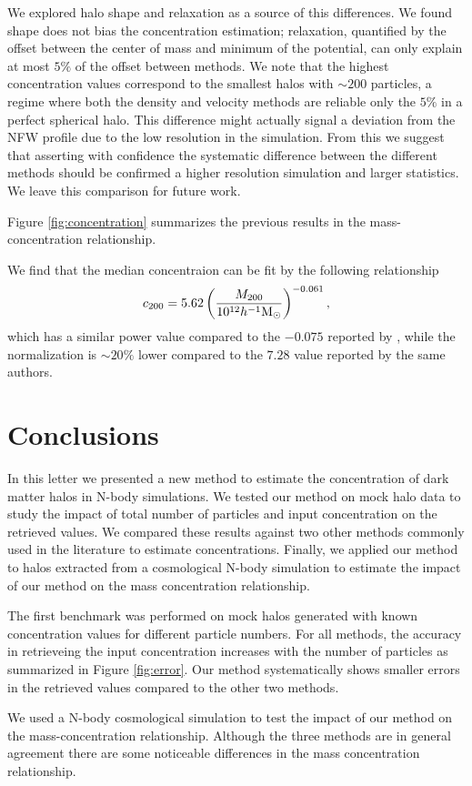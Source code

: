 \documentclass[a4,useAMS,usenatbib,usegraphicx]{mn2e}
\newcommand{\hMsun}{{\ifmmode{h^{-1}{\rm {M_{\odot}}}}\else{$h^{-1}{\rm{M_{\odot}}}$}\fi}}
\begin{document}
We explored halo shape and relaxation as a source of this
differences. We found shape does not bias the concentration
estimation; relaxation, quantified by the
offset between the center of mass and minimum of the potential, can
only explain at most $5\%$ of the offset between methods.  We note
that the highest concentration values correspond to the smallest halos
with $\sim 200$ particles, a regime where both the density and
velocity methods are reliable only the $5\%$ in a perfect spherical
halo.  
This difference might actually signal a deviation from the NFW profile
due to the low resolution in the simulation. From this we suggest that
asserting with confidence the systematic difference between the
different methods should be confirmed  a higher resolution simulation
and larger statistics. We leave this comparison for future work. 
  

Figure \ref{fig:concentration} summarizes the previous results in the
mass-concentration relationship.

We find that the median concentraion can be fit by the following
relationship
\begin{equation}
c_{200} = 5.62 \left(\frac{M_{200}}{10^{12}\hMsun}\right)^{-0.061}, 
\end{equation}
%
which has a similar power value compared to the $-0.075$ reported by
\citep{Prada2012}, while the normalization is $\sim 20\%$ lower
compared to the $7.28$ value reported by the same authors. 


\section{Conclusions}
\label{sec:conclusions}

In this letter we presented a new method to estimate the concentration
of dark matter halos in N-body simulations.  
We tested our method on mock halo data to study the impact of total
number of particles and input concentration on the retrieved values.  
We compared these results against two other methods commonly used in
the literature to estimate concentrations.  Finally, we applied our
method to halos extracted from a cosmological N-body simulation to
estimate the impact of our method on the mass concentration relationship.


The first benchmark was performed on mock halos generated with known
concentration values for different particle numbers.  For all methods,
the accuracy in retrieveing the input concentration increases with the
number of particles as summarized in Figure \ref{fig:error}.  Our
method systematically shows smaller errors in the retrieved values
compared to the other two methods.

We used a N-body cosmological simulation to test the impact of our
method on the mass-concentration relationship.  Although the three
methods are in general agreement there are some noticeable differences
in the mass concentration relationship.





\end{document}
